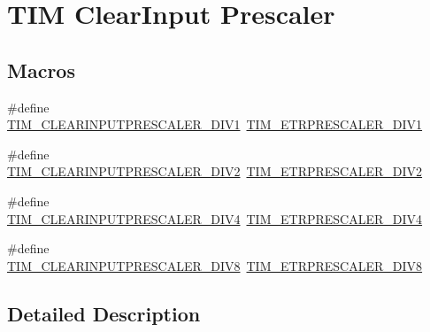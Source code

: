 \hypertarget{group___t_i_m___clear_input___prescaler}{\section{T\-I\-M Clear\-Input Prescaler}
\label{group___t_i_m___clear_input___prescaler}
}
\subsection*{Macros}
\begin{DoxyCompactItemize}
\item 
\#define \hyperlink{group___t_i_m___clear_input___prescaler_gaf88d719dd5535b6b58275549c4512ec7}{T\-I\-M\-\_\-\-C\-L\-E\-A\-R\-I\-N\-P\-U\-T\-P\-R\-E\-S\-C\-A\-L\-E\-R\-\_\-\-D\-I\-V1}~\hyperlink{group___t_i_m___e_t_r___prescaler_gabead5364c62645592e42545ba09ab88a}{T\-I\-M\-\_\-\-E\-T\-R\-P\-R\-E\-S\-C\-A\-L\-E\-R\-\_\-\-D\-I\-V1}
\item 
\#define \hyperlink{group___t_i_m___clear_input___prescaler_gae54b2f4ea04ef97f7c75755347edc8ba}{T\-I\-M\-\_\-\-C\-L\-E\-A\-R\-I\-N\-P\-U\-T\-P\-R\-E\-S\-C\-A\-L\-E\-R\-\_\-\-D\-I\-V2}~\hyperlink{group___t_i_m___e_t_r___prescaler_gaf7fe49f67bdb6b33b9b41953fee75680}{T\-I\-M\-\_\-\-E\-T\-R\-P\-R\-E\-S\-C\-A\-L\-E\-R\-\_\-\-D\-I\-V2}
\item 
\#define \hyperlink{group___t_i_m___clear_input___prescaler_gae3c3dea810bb9d83b532737f01a3213d}{T\-I\-M\-\_\-\-C\-L\-E\-A\-R\-I\-N\-P\-U\-T\-P\-R\-E\-S\-C\-A\-L\-E\-R\-\_\-\-D\-I\-V4}~\hyperlink{group___t_i_m___e_t_r___prescaler_gaa09da30c3cd28f1fe6b6f3f599a5212c}{T\-I\-M\-\_\-\-E\-T\-R\-P\-R\-E\-S\-C\-A\-L\-E\-R\-\_\-\-D\-I\-V4}
\item 
\#define \hyperlink{group___t_i_m___clear_input___prescaler_ga34bc6cb7ee8800cc48b1ee6c536859cc}{T\-I\-M\-\_\-\-C\-L\-E\-A\-R\-I\-N\-P\-U\-T\-P\-R\-E\-S\-C\-A\-L\-E\-R\-\_\-\-D\-I\-V8}~\hyperlink{group___t_i_m___e_t_r___prescaler_ga834e38200874cced108379b17a24d0b7}{T\-I\-M\-\_\-\-E\-T\-R\-P\-R\-E\-S\-C\-A\-L\-E\-R\-\_\-\-D\-I\-V8}
\end{DoxyCompactItemize}


\subsection{Detailed Description}


